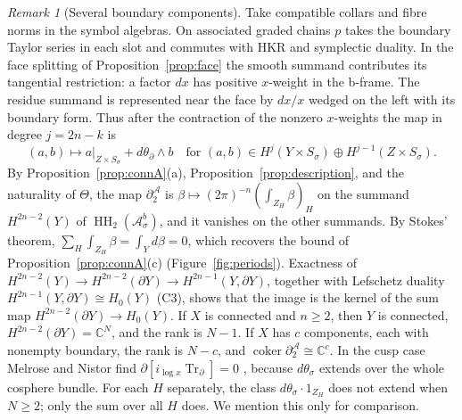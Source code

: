\documentclass[11pt,oneside,reqno]{article}
\DeclareMathOperator{\HH}{HH}
\newcommand{\C}{\mathbb C}
\DeclareMathOperator{\Tr}{Tr}
\newcommand{\Asb}{\mathcal A^b_\sigma}
\theoremstyle{plain}
\theoremstyle{definition}
\theoremstyle{remark}
\newtheorem{remark}[theorem]{Remark}
\begin{document}
\begin{remark}[Several boundary components]\label{rem:MNcomponents}
Take compatible collars and fibre norms in the symbol algebras.
On associated graded chains \(p\) takes the boundary Taylor series
in each slot and commutes with HKR and symplectic duality.
In the face splitting of Proposition~\ref{prop:face} the smooth
summand contributes its tangential restriction: a factor \(dx\)
has positive \(x\)-weight in the b-frame. The residue summand is
represented near the face by \(dx/x\) wedged on the left with its
boundary form. Thus after the contraction of the nonzero
\(x\)-weights the map in degree \(j=2n-k\) is
\[
 (a,b)\longmapsto a|_{Z\times S_\sigma}+d\theta_\partial\wedge b
 \quad\text{for }(a,b)\in H^j(Y\times S_\sigma)\oplus
 H^{j-1}(Z\times S_\sigma).
\]
By Proposition~\ref{prop:connA}(a), Proposition~\ref{prop:description},
and the naturality of \(\Theta\), the map \(\partial^{\mathcal A}_2\) is
\(\beta\mapsto(2\pi)^{-n}(\int_{Z_H}\beta)_H\) on the summand \(H^{2n-2}(Y)\) of
\(\HH_2(\Asb)\), and it vanishes on the other summands. By Stokes' theorem,
\(\sum_H\int_{Z_H}\beta=\int_Yd\beta=0\), which recovers the bound of
Proposition~\ref{prop:connA}(c) (Figure~\ref{fig:periods}). Exactness of
\(H^{2n-2}(Y)\to H^{2n-2}(\partial Y)\to H^{2n-1}(Y,\partial Y)\), together
with Lefschetz duality \(H^{2n-1}(Y,\partial Y)\cong H_0(Y)\) (C3), shows
that the image is the kernel of the sum map
\(H^{2n-2}(\partial Y)\to H_0(Y)\). If \(X\) is connected and \(n\geq2\),
then \(Y\) is connected, \(H^{2n-2}(\partial Y)=\C^N\), and the rank is
\(N-1\). If \(X\) has \(c\) components, each with nonempty boundary, the rank is
\(N-c\), and \(\operatorname{coker}\partial^{\mathcal A}_2\cong\C^c\). In the cusp case
Melrose and Nistor find \(\partial[i_{\log x}\Tr_\partial]=0\)
\cite[Prop.~12]{MN}, because \(d\theta_\sigma\) extends over the whole
cosphere bundle. For each \(H\) separately, the class
\(d\theta_\sigma\cdot1_{Z_H}\) does not extend when \(N\geq2\); only the
sum over all \(H\) does. We mention this only for comparison.
\end{remark}
\end{document}
